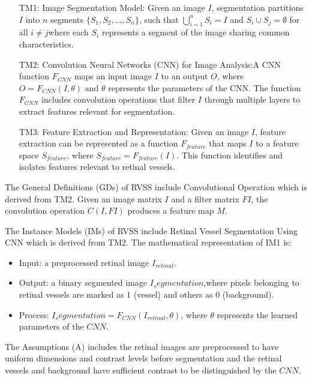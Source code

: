 \documentclass[12pt]{article}
\begin{document}
\begin{itemize}

\item[TM1:]Image Segmentation Model:  Given an image $I$, segmentation partitions $I$ into $n$ segments $\{S_1,S_2,...,S_n\}$, such that $\bigcup_{i=1}^{n}S_i = I$ and $S_i \cup S_j = \emptyset$ for all $i \neq j$where each $S_i$ represents a segment of the image sharing common characteristics.

\item[TM2:]{Convolution Neural Networks (CNN) for Image Analysis}:A CNN function $F_{CNN}$ maps an input image $I$ to an output $O$, where $O=F_{CNN}(I,\theta)$ and $\theta$ represents the parameters of the CNN. The function $F_{CNN}$ includes convolution operations that filter $I$ through multiple layers to extract features relevant for segmentation.

\item[TM3:]Feature Extraction and Representation:  Given an image $I$, feature extraction can be represented as a function $F_{feature}$ that maps $I$ to a feature space $S_{feature}$, where $S_{feature} = F_{feature}(I)$. This function identifies and isolates features relevant to retinal vessels.

\end{itemize}

The General Definitions (GDs) of RVSS include Convolutional Operation which is derived from TM2. Given an image matrix $I$ and a filter matrix $FI$, the convolution operation $C(I,FI)$ produces a feature map $M$. 

The Instance Models (IMs) of RVSS include Retinal Vessel Segmentation Using CNN which is derived from TM2. The mathematical representation of IM1 is:
\begin{itemize}
    \item Input: a preprocessed retinal image $I_{retinal}$.
    \item Output: a binary segmented image $I_segmentation$,where pixels belonging to retinal vessels are marked as 1 (vessel) and others as 0 (background).
    \item Process: $I_segmentation = F_{CNN} (I_{retinal}, \theta)$, where $\theta$ represents the learned parameters of the $CNN$.
\end{itemize}

The Assumptions (A) includes the retinal images are preprocessed to have uniform dimensions and contrast levels before segmentation and the retinal vessels and background have sufficient contrast to be distinguished by the $CNN$.
\end{document}
